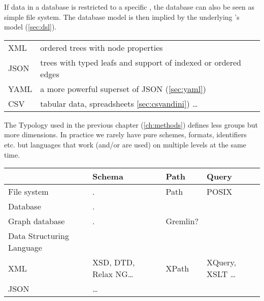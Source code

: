{%

If data in a database is restricted to a specific , the database can also be seen as simple file system. The
database model is then implied by the underlying 's model 
(\ref{sec:dsl}).

\begin{tabular}{l|l}
  XML & ordered trees with node properties \\
  JSON & trees with typed leafs and support of indexed or ordered edges \\
  YAML &  a more powerful superset of JSON (\ref{sec:yaml}) \\
  CSV & tabular data, spreadsheets \ref{sec:csvandini}) \ldots
\end{tabular}





The Typology used in the previous chapter (\ref{ch:methods}) defines less
groups but more dimensions. In practice we rarely have pure schemes,
formats, identifiers etc. but languages that work (and/or are used) on
multiple levels at the same time. 


\begin{center}
\begin{tabular}{l|l|l|l}
            & Schema & Path & Query \\
\hline
File system & . & Path & POSIX \\
Database    & . &  \\
Graph database  & . & Gremlin? \\
Data Structuring Language & \\
XML & XSD, DTD, Relax NG\ldots & XPath & XQuery, XSLT \ldots \\
JSON & \ldots \\
\end{tabular}
\end{center}

}
